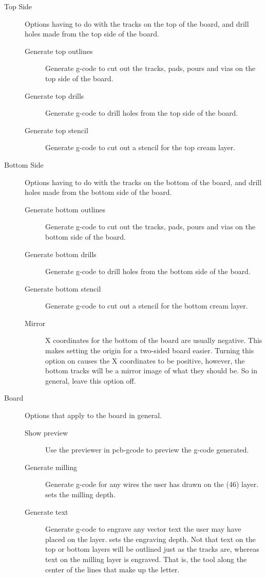 \documentclass[11pt]{book}
\begin{document}
\begin{description}
	\item[Top Side] Options having to do with the tracks on the top of the board, and drill holes made from the top side of the board.
	\begin{description}
		\item[Generate top outlines] Generate g-code to cut out the tracks, pads, pours and vias on the top side of the board.
		\item[Generate top drills] Generate g-code to drill holes from the top side of the board.
		\item[Generate top stencil] Generate g-code to cut out a stencil for the top cream layer.
	\end{description}
	\item[Bottom Side] Options having to do with the tracks on the bottom of the board, and drill holes made from the bottom side of the board.
	\begin{description}
		\item[Generate bottom outlines] Generate g-code to cut out the tracks, pads, pours and vias on the bottom side of the board.
		\item[Generate bottom drills] Generate g-code to drill holes from the bottom side of the board.
		\item[Generate bottom stencil] Generate g-code to cut out a stencil for the bottom cream layer.
		\item[Mirror] X coordinates for the bottom of the board are usually negative. This makes setting the origin for a two-sided board easier. Turning this option on causes the X coordinates to be positive, however, the bottom tracks will be a mirror image of what they should be. So in general, leave this option off.
	\end{description}
	\item[Board] Options that apply to the board in general.
	\begin{description}
		\item[Show preview] Use the previewer in pcb-gcode to preview the g-code generated.
		\item[Generate milling] Generate g-code for any wires the user has drawn on the  (46) layer.  sets the milling depth.
		\item[Generate text] Generate g-code to engrave any vector text the user may have placed on the  layer.  sets the engraving depth. Not that text on the top or bottom layers will be outlined just as the tracks are, whereas text on the milling layer is engraved. That is, the tool along the center of the lines that make up the letter.

\end{description}
\end{description}
\end{document}
